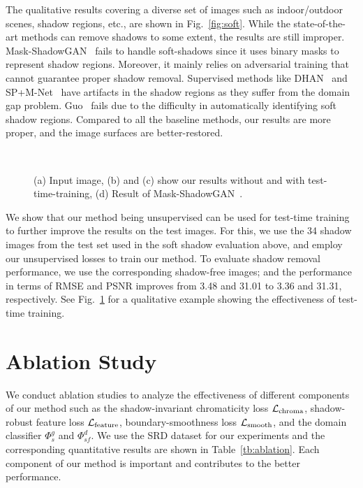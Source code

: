 \documentclass[10pt,twocolumn,letterpaper]{article}
\begin{document}
The qualitative results covering a diverse set of images such as indoor/outdoor scenes, shadow regions, etc., are shown in Fig.~\ref{fig:soft}.
While the state-of-the-art methods can remove shadows to some extent, the results are still improper.
Mask-ShadowGAN~\cite{Hu19} fails to handle soft-shadows since it uses binary masks to represent shadow regions. Moreover, it mainly relies on adversarial training that cannot guarantee proper shadow removal. 
Supervised methods like DHAN~\cite{Cun20} and SP+M-Net~\cite{Le19} have artifacts in the shadow regions as they suffer from the domain gap problem.  
Guo~\cite{Guo12} fails due to the difficulty in automatically identifying soft shadow regions.
Compared to all the baseline methods, our results are more proper, and the image surfaces are better-restored. 


\begin{figure}[t]
	\centering
	\captionsetup[subfloat]{farskip=2pt}
	\hfill
	\hfill
	\hfill
	\hfill\\
	\vspace{-0.01in}
	\caption{ (a) Input image, (b) and (c) show our results without and with test-time-training, (d) Result of Mask-ShadowGAN~\cite{Hu19}.}
	\label{fig:testtime}
\end{figure}

\vspace{0.2cm}
We show that our method being unsupervised can be used for test-time training to further improve the results on the test images. For this, we use the 34 shadow images from the test set used in the soft shadow evaluation above, and employ our unsupervised losses to train our method.
To evaluate shadow removal performance, we use the corresponding shadow-free images; and the performance in terms of RMSE and PSNR improves from 3.48 and 31.01 to 3.36 and 31.31, respectively. 
See Fig.~\ref{fig:testtime} for a qualitative example showing the effectiveness of test-time training. 
\section{Ablation Study}
\label{sec:ablation}
We conduct ablation studies to analyze the effectiveness of different components of our method such as the shadow-invariant chromaticity loss $\mathcal{L}_{\rm chroma}$, shadow-robust feature loss $\mathcal{L}_{\rm feature}$, boundary-smoothness loss $\mathcal{L}_{\rm smooth}$, and the domain classifier $\Phi^g_s$ and $\Phi^d_{sf}$. We use the SRD dataset for our experiments and the corresponding quantitative results are shown in Table~\ref{tb:ablation}. Each component of our method is important and contributes to the better performance.
\end{document}

